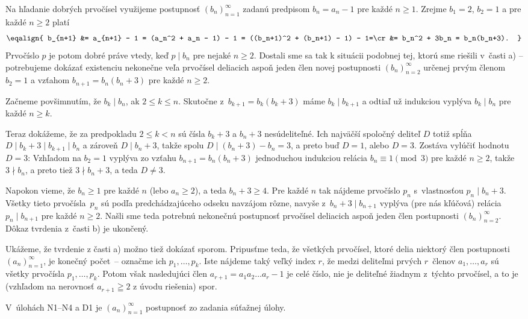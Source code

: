 {Na hľadanie dobrých prvočísel využijeme postupnosť
$(b_n)_{n=1}^\infty$ zadanú predpisom $b_n = a_n-1$ pre každé
$n\geq1$. Zrejme $b_1 = 2$,
$b_2 = 1$ a pre každé $n\geq2$ platí
$$\eqalign{
b_{n+1} &= a_{n+1} - 1 = (a_n^2 + a_n - 1) - 1 = ((b_n+1)^2 +
(b_n+1) - 1) - 1=\cr
&= b_n^2 + 3b_n = b_n(b_n+3).
}$$
Prvočíslo $p$ je potom dobré práve vtedy, keď $p \mid b_n$
pre nejaké $n \geq 2$. Dostali sme sa tak k situácii podobnej tej,
ktorú sme riešili v~časti a) -- potrebujeme dokázať
existenciu nekonečne veľa prvočísel deliacich aspoň
jeden člen novej postupnosti
$(b_n)_{n=2}^\infty$ určenej prvým členom $b_2=1$ a
vzťahom $b_{n+1}=b_n(b_n+3)$ pre každé $n\geq2$.

Začneme povšimnutím, že $b_k \mid b_n$, ak $2\leq k\leq n$.
Skutočne z~$b_{k+1} = b_k(b_k+3)$ máme $b_k \mid b_{k+1}$ a
odtiaľ už indukciou vyplýva $b_k \mid b_n$ pre každé $n\geq k$.

Teraz dokážeme, že za predpokladu $2\leq k<n$ sú čísla $b_k+3$ a $b_n+3$
nesúdeliteľné. Ich najväčší spoločný deliteľ $D$ totiž spĺňa
$D \mid b_k+3 \mid b_{k+1}\mid b_n$ a zároveň $D \mid b_n+3$,
takže spolu $D \mid (b_n+3)-b_n=3$, a preto buď $D = 1$, alebo
$D = 3$. Zostáva vylúčiť hodnotu $D=3$: Vzhľadom na $b_2=1$
vyplýva zo vzťahu
$b_{n+1} = b_n(b_n+3)$ jednoduchou indukciou relácia $b_n \equiv 1 \pmod 3$
pre každé $n \geq 2$, takže $3 \nmid b_n$, a preto tiež
$3 \nmid b_n+3$, a teda $D\ne3$.

Napokon vieme, že $b_n \geq 1$ pre každé $n$ (lebo $a_n \geq 2$),
a teda $b_n+3 \geq 4$. Pre každé $n$ tak nájdeme prvočíslo $p_n$
s~vlastnosťou $p_n \mid b_n+3$. Všetky tieto prvočísla~$p_n$ sú
podľa predchádzajúceho odseku navzájom rôzne, navyše
z~$b_n+3 \mid b_{n+1}$ vyplýva (pre nás kľúčová) relácia
$p_n \mid b_{n+1}$ pre každé $n \geq 2$.
Našli sme teda potrebnú nekonečnú postupnosť
prvočísel deliacich aspoň jeden člen postupnosti
$(b_n)_{n=2}^\infty$. Dôkaz tvrdenia z~časti b) je ukončený.

  \Pozn
Ukážeme, že tvrdenie z časti a) možno tiež dokázať sporom.
Pripusťme teda, že všetkých prvočísel, ktoré delia niektorý člen
postupnosti $(a_n)_{n=1}^\infty$, je konečný počet~-- označme ich
$p_1,\dots,p_k$. Iste nájdeme taký veľký index $r$, že
medzi deliteľmi prvých $r$~členov $a_1,\dots,a_r$ sú všetky
prvočísla $p_1,\dots,p_k$. Potom však nasledujúci člen
$a_{r+1}=a_1a_2\dots a_r-1$ je celé číslo, nie je deliteľné žiadnym
z~týchto prvočísel, a to je (vzhľadom na nerovnosť $a_{r+1}\geqq2$
z úvodu riešenia) spor.


{\everypar{}
\smallskip
V~úlohách N1--N4 a D1 je $(a_n)_{n=1}^\infty$ postupnosť zo
zadania súťažnej úlohy.
\smallskip
}

}
